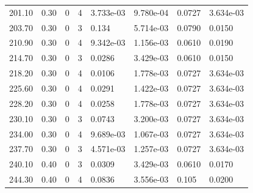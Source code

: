 \documentclass[preview]{standalone}
\begin{document}
{{{\begin{tabular}{L{1.2cm}C{1.2cm} C{0.3cm}C{0.5cm} C{1.4cm}C{1.4cm} C{1.4cm}C{1.4cm}}
  201.10  &  0.30  & 0     &  4 &  3.733e-03  & 9.780e-04  & 0.0727 &  3.634e-03   \\ 
  203.70  &  0.30  & 0     &  3 &  0.134  & 5.714e-03  & 0.0790 &  0.0150   \\ 
  210.90  &  0.30  & 0     &  4 &  9.342e-03  & 1.156e-03  & 0.0610 &  0.0190   \\ 
  214.70  &  0.30  & 0     &  3 &  0.0286  & 3.429e-03  & 0.0610 &  0.0150   \\ 
  218.20  &  0.30  & 0     &  4 &  0.0106  & 1.778e-03  & 0.0727 &  3.634e-03   \\ 
  225.60  &  0.30  & 0     &  4 &  0.0291  & 1.422e-03  & 0.0727 &  3.634e-03   \\ 
  228.20  &  0.30  & 0     &  4 &  0.0258  & 1.778e-03  & 0.0727 &  3.634e-03   \\ 
  230.10  &  0.30  & 0     &  3 &  0.0743  & 3.200e-03  & 0.0727 &  3.634e-03   \\ 
  234.00  &  0.30  & 0     &  4 &  9.689e-03  & 1.067e-03  & 0.0727 &  3.634e-03   \\ 
  237.70  &  0.30  & 0     &  3 &  4.571e-03  & 1.257e-03  & 0.0727 &  3.634e-03   \\ 
  240.10  &  0.40  & 0     &  3 &  0.0309  & 3.429e-03  & 0.0610 &  0.0170   \\ 
  244.30  &  0.40  & 0     &  4 &  0.0836  & 3.556e-03  & 0.105 &  0.0200   \\ 
\hline 
\end{tabular} 

}}}
\end{document}
